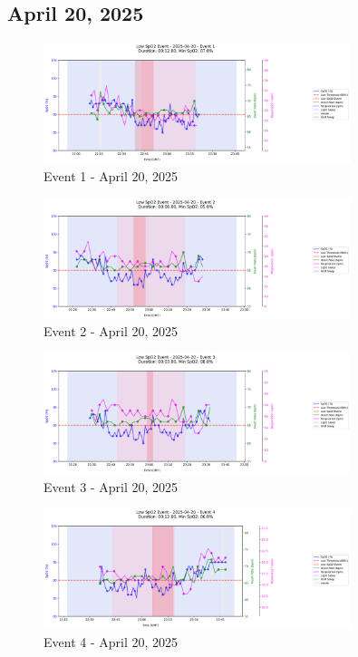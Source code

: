 \documentclass{article}
\begin{document}
\subsection{April 20, 2025}
\begin{figure}[htbp]
    \centering
    \includegraphics[width=0.8\textwidth]{images/2025-04-20_event_1.png}
    \caption{Event 1 - April 20, 2025}
\end{figure}
\begin{figure}[htbp]
    \centering
    \includegraphics[width=0.8\textwidth]{images/2025-04-20_event_2.png}
    \caption{Event 2 - April 20, 2025}
\end{figure}
\begin{figure}[htbp]
    \centering
    \includegraphics[width=0.8\textwidth]{images/2025-04-20_event_3.png}
    \caption{Event 3 - April 20, 2025}
\end{figure}
\begin{figure}[htbp]
    \centering
    \includegraphics[width=0.8\textwidth]{images/2025-04-20_event_4.png}
    \caption{Event 4 - April 20, 2025}
\end{figure}
\clearpage
\end{document}
